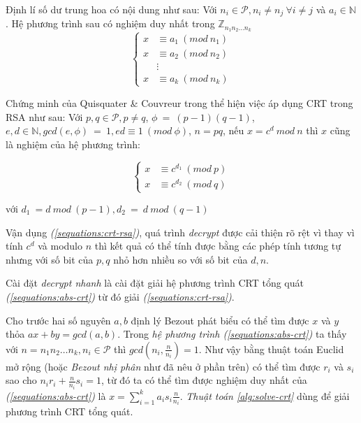 Định lí số dư trung hoa có nội dung như sau: Với $n_i \in \mathcal{P}, n_i \neq n_j\ \forall i \neq j$ và $a_i \in \mathbb{N}$. Hệ phương trình sau có nghiệm 
duy nhất trong $\mathbb{Z}_{n_1n_2\hdots n_k}$
\begin{equation}\label{sequations:abs-crt}
\begin{cases}
x &\equiv a_1\ (mod\ n_1) \\
x &\equiv a_2\ (mod\ n_2) \\
& \vdots \\
x &\equiv a_k\ (mod\ n_k)
\end{cases}
\end{equation}

Chứng minh của Quisquater \& Couvreur trong \cite{Quisquater1982} thể hiện việc áp dụng CRT trong RSA như sau: Với $p, q \in \mathcal{P}, p \neq q$, $\phi\ =\ (p -1)(q-1)$, 
$e,d \in \mathbb{N}, gcd(e,\phi)\ =\ 1, ed \equiv 1\ (mod\ \phi)$, $n = pq$, nếu $x = c^d\ mod \ n$ thì $x$ cũng là nghiệm của hệ phương trình:

\begin{equation}\label{sequations:crt-rsa}
\begin{cases}
x &\equiv c^{d_1}\ (mod\ p) \\
x &\equiv c^{d_2}\ (mod\ q)
\end{cases}
\end{equation}
\begin{center}
với $d_1\ = d\ mod\ (p - 1), d_2\ =\ d\ mod\ (q - 1) $
\end{center}

Vận dụng \textit{(\ref{sequations:crt-rsa})}, quá trình \textit{decrypt} được cải thiện rõ rệt vì thay vì tính $c^d$ và modulo $n$ thì kết quả có thể tính 
được bằng các phép tính tương tự nhưng với số bit của $p, q$ nhỏ hơn nhiều so với số bit của $d, n$.

Cài đặt \textit{decrypt nhanh} là cài đặt giải hệ phương trình CRT tổng quát \textit{(\ref{sequations:abs-crt})} từ đó giải \textit{(\ref{sequations:crt-rsa})}. 

Cho trước hai số nguyên $a,b$ định lý Bezout phát biểu có thể tìm được $x$ và $y$ thỏa $ax + by = gcd(a,b)$. Trong \textit{hệ phương trình 
(\ref{sequations:abs-crt})} ta thấy với $n=n_1n_2\hdots n_k, n_i \in \mathcal{P}$ thì $gcd(n_i,\frac{n}{n_i}) = 1$. Như vậy bằng thuật toán Euclid mở rộng (hoặc \textit{Bezout nhị phân} \cite{giaotrinh} như đã nêu ở phần trên) có thể tìm được 
$r_i$ và $s_i$ sao cho $n_i r_i + \frac{n}{n_i} s_i = 1$, từ đó ta có thể tìm được nghiệm duy nhất của \textit{(\ref{sequations:abs-crt})} là $x = \sum_{i=1}^{k}a_is_i\frac{n}{n_i}$. 
\textit{Thuật toán \ref{alg:solve-crt}} dùng để giải phương trình CRT tổng quát.

